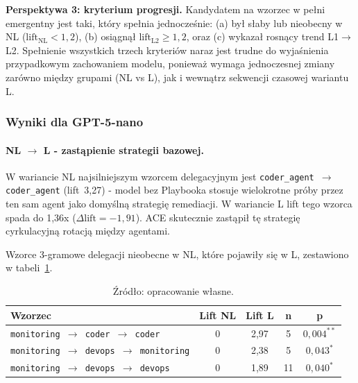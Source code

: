 \textbf{Perspektywa 3: kryterium progresji.} Kandydatem na wzorzec w pełni emergentny jest taki, który spełnia jednocześnie: (a) był słaby lub nieobecny w NL ($\mathrm{lift}_\mathrm{NL} < 1{,}2$), (b) osiągnął $\mathrm{lift}_\mathrm{L2} \geq 1{,}2$, oraz (c) wykazał rosnący trend L1$\to$L2. Spełnienie wszystkich trzech kryteriów naraz jest trudne do wyjaśnienia przypadkowym zachowaniem modelu, ponieważ wymaga jednoczesnej zmiany zarówno między grupami (NL vs L), jak i wewnątrz sekwencji czasowej wariantu L.

\subsubsection{Wyniki dla GPT-5-nano}

\paragraph{NL $\to$ L - zastąpienie strategii bazowej.}
W wariancie NL najsilniejszym wzorcem delegacyjnym jest \texttt{coder\_agent $\to$ coder\_agent} (lift~3,27) - model bez Playbooka stosuje wielokrotne próby przez ten sam agent jako domyślną strategię remediacji. W wariancie L lift tego wzorca spada do 1,36x ($\Delta\mathrm{lift} = -1{,}91$). ACE skutecznie zastąpił tę strategię cyrkulacyjną rotacją między agentami.

Wzorce 3-gramowe delegacji nieobecne w NL, które pojawiły się w L, zestawiono w tabeli~\ref{tab:emergent-3grams-gpt5}.

\begin{table}[H]
    \centering
    \caption{Wzorce 3-gramowe delegacji nieobecne w wariancie NL, które pojawiły się w wariancie L (GPT-5-nano). Lift NL $= 0$ oznacza brak wzorca poniżej progu $n \geq 5$ w wariancie bez uczenia.}
    \label{tab:emergent-3grams-gpt5}
    \footnotesize
    \begin{tabular}{p{}cccc}
        \hline
        \textbf{Wzorzec} & \textbf{Lift NL} & \textbf{Lift L} & \textbf{n} & \textbf{p} \\
        \hline
        \texttt{monitoring $\to$ coder $\to$ coder}       & 0     & 2,97 & 5  & $0{,}004^{**}$ \\
        \texttt{monitoring $\to$ devops $\to$ monitoring} & 0     & 2,38 & 5  & $0{,}043^{*}$  \\
        \texttt{monitoring $\to$ devops $\to$ devops}     & 0    & 1,89 & 11 & $0{,}040^{*}$  \\
        \hline
    \end{tabular}
    \caption*{\footnotesize Źródło: opracowanie własne.}
\end{table}

